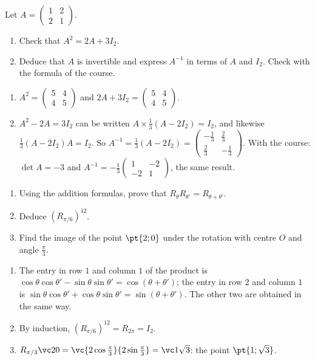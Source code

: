 \begin{exercise}
Let $A=\begin{pmatrix}1&2\\2&1\end{pmatrix}$.
\begin{enumerate}
\item Check that $A^2=2A+3I_2$.
\item Deduce that $A$ is invertible and express $A^{-1}$ in terms of $A$ and $I_2$. Check with the formula of the course.
\end{enumerate}
\end{exercise}
\begin{solution}
\begin{enumerate}
\item $A^2=\begin{pmatrix}5&4\\4&5\end{pmatrix}$ and $2A+3I_2=\begin{pmatrix}5&4\\4&5\end{pmatrix}$.
\item $A^2-2A=3I_2$ can be written $A\times\frac13(A-2I_2)=I_2$, and likewise $\frac13(A-2I_2)A=I_2$. So $A^{-1}=\frac13(A-2I_2)=\begin{pmatrix}-\frac13&\frac23\\\frac23&-\frac13\end{pmatrix}$. With the course: $\det A=-3$ and $A^{-1}=-\frac13\begin{pmatrix}1&-2\\-2&1\end{pmatrix}$, the same result.
\end{enumerate}
\end{solution}

\begin{exercise}[Rotations]
\begin{enumerate}
\item Using the addition formulas, prove that $R_\theta R_{\theta'}=R_{\theta+\theta'}$.
\item Deduce $\left(R_{\pi/6}\right)^{12}$.
\item Find the image of the point $\pt{2;0}$ under the rotation with centre $O$ and angle $\frac\pi3$.
\end{enumerate}
\end{exercise}
\begin{solution}
\begin{enumerate}
\item The entry in row $1$ and column $1$ of the product is $\cos\theta\cos\theta'-\sin\theta\sin\theta'=\cos(\theta+\theta')$; the entry in row $2$ and column $1$ is $\sin\theta\cos\theta'+\cos\theta\sin\theta'=\sin(\theta+\theta')$. The other two are obtained in the same way.
\item By induction, $\left(R_{\pi/6}\right)^{12}=R_{2\pi}=I_2$.
\item $R_{\pi/3}\vc20=\vc{2\cos\frac\pi3}{2\sin\frac\pi3}=\vc1{\sqrt3}$: the point $\pt{1;\sqrt3}$.
\end{enumerate}
\end{solution}


